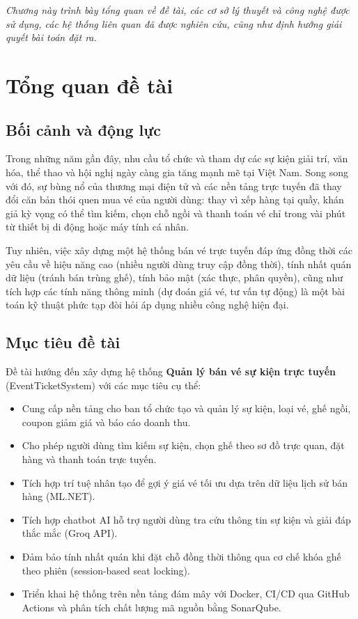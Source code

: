 \documentclass[../main.tex]{subfiles}
\begin{document}
\textit{Chương này trình bày tổng quan về đề tài, các cơ sở lý thuyết và công nghệ được sử dụng, các hệ thống liên quan đã được nghiên cứu, cũng như định hướng giải quyết bài toán đặt ra.}

\section{Tổng quan đề tài}

\subsection{Bối cảnh và động lực}

Trong những năm gần đây, nhu cầu tổ chức và tham dự các sự kiện giải trí, văn hóa, thể thao và hội nghị ngày càng gia tăng mạnh mẽ tại Việt Nam. Song song với đó, sự bùng nổ của thương mại điện tử và các nền tảng trực tuyến đã thay đổi căn bản thói quen mua vé của người dùng: thay vì xếp hàng tại quầy, khán giả kỳ vọng có thể tìm kiếm, chọn chỗ ngồi và thanh toán vé chỉ trong vài phút từ thiết bị di động hoặc máy tính cá nhân.

Tuy nhiên, việc xây dựng một hệ thống bán vé trực tuyến đáp ứng đồng thời các yêu cầu về hiệu năng cao (nhiều người dùng truy cập đồng thời), tính nhất quán dữ liệu (tránh bán trùng ghế), tính bảo mật (xác thực, phân quyền), cũng như tích hợp các tính năng thông minh (dự đoán giá vé, tư vấn tự động) là một bài toán kỹ thuật phức tạp đòi hỏi áp dụng nhiều công nghệ hiện đại.

\subsection{Mục tiêu đề tài}

Đề tài hướng đến xây dựng hệ thống \textbf{Quản lý bán vé sự kiện trực tuyến} (EventTicketSystem) với các mục tiêu cụ thể:

\begin{itemize}
    \item Cung cấp nền tảng cho ban tổ chức tạo và quản lý sự kiện, loại vé, ghế ngồi, coupon giảm giá và báo cáo doanh thu.
    \item Cho phép người dùng tìm kiếm sự kiện, chọn ghế theo sơ đồ trực quan, đặt hàng và thanh toán trực tuyến.
    \item Tích hợp trí tuệ nhân tạo để gợi ý giá vé tối ưu dựa trên dữ liệu lịch sử bán hàng (ML.NET).
    \item Tích hợp chatbot AI hỗ trợ người dùng tra cứu thông tin sự kiện và giải đáp thắc mắc (Groq API).
    \item Đảm bảo tính nhất quán khi đặt chỗ đồng thời thông qua cơ chế khóa ghế theo phiên (session-based seat locking).
    \item Triển khai hệ thống trên nền tảng đám mây với Docker, CI/CD qua GitHub Actions và phân tích chất lượng mã nguồn bằng SonarQube.
\end{itemize}
\end{document}
